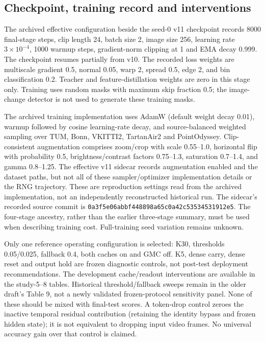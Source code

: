 \subsection{Checkpoint, training record and interventions}
The archived effective configuration beside the seed-0 v11 checkpoint records
8000 final-stage steps, clip length 24, batch size 2, image size 256, learning
rate $3\times10^{-4}$, 1000 warmup steps, gradient-norm clipping at 1 and EMA
decay 0.999. The checkpoint resumes partially from v10. The recorded loss
weights are multiscale gradient 0.5, normal 0.05, warp 2, spread 0.5, edge 2,
and bin classification 0.2. Teacher and feature-distillation weights are zero
in this stage only. Training uses random masks with maximum skip fraction 0.5;
the image-change detector is not used to generate these training masks.

The archived training implementation uses AdamW (default weight decay 0.01),
warmup followed by cosine learning-rate decay, and source-balanced weighted
sampling over TUM, Bonn, VKITTI2, TartanAir2 and PointOdyssey. Clip-consistent
augmentation comprises zoom/crop with scale 0.55--1.0, horizontal flip with
probability 0.5, brightness/contrast factors 0.75--1.3, saturation 0.7--1.4,
and gamma 0.8--1.25. The effective v11
sidecar records augmentation enabled and the dataset paths, but not all of
these sampler/optimizer implementation details or the RNG trajectory.
These are reproduction settings read from the archived implementation, not
an independently reconstructed historical run. The sidecar's recorded source
commit is \texttt{0a3f5e06abbf448898a65c0a42c53534531912e5}.
The four-stage ancestry, rather than the earlier three-stage summary, must be
used when describing training cost. Full-training seed variation remains unknown.

Only one reference operating configuration is selected: K30, thresholds
0.05/0.025, fallback 0.4, both caches on and GMC off. K5, dense carry, dense
reset and output hold are frozen diagnostic controls, not post-test deployment
recommendations. The development cache/readout interventions are available in
the study-5--8 tables. Historical threshold/fallback sweeps remain in the older
draft's Table 9, not a newly validated frozen-protocol sensitivity panel. None
of these should be mixed with final-test scores. A token-drop control zeroes
the inactive temporal residual contribution (retaining the identity bypass
and frozen hidden state); it is not equivalent to dropping input
video frames. No universal accuracy gain over that control is claimed.

